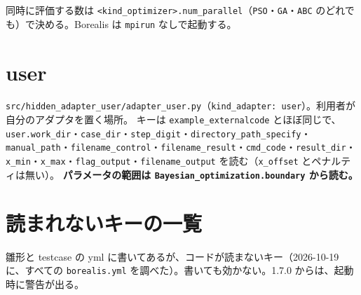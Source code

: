 同時に評価する数は \texttt{<kind\_\allowbreak{}optimizer>.\allowbreak{}num\_\allowbreak{}parallel}（\texttt{PSO}・\texttt{GA}・\texttt{ABC} のどれでも）で決める。Borealis は \texttt{mpirun} なしで起動する。

\section{user}

\texttt{src/\allowbreak{}hidden\_\allowbreak{}adapter\_\allowbreak{}user/\allowbreak{}adapter\_\allowbreak{}user.\allowbreak{}py}（\texttt{kind\_\allowbreak{}adapter: user}）。利用者が自分のアダプタを置く場所。
キーは \texttt{example\_\allowbreak{}externalcode} とほぼ同じで、\texttt{user.\allowbreak{}work\_\allowbreak{}dir}・\texttt{case\_\allowbreak{}dir}・\texttt{step\_\allowbreak{}digit}・\texttt{directory\_\allowbreak{}path\_\allowbreak{}specify}・\texttt{manual\_\allowbreak{}path}・\texttt{filename\_\allowbreak{}control}・\texttt{filename\_\allowbreak{}result}・\texttt{cmd\_\allowbreak{}code}・\texttt{result\_\allowbreak{}dir}・\texttt{x\_\allowbreak{}min}・\texttt{x\_\allowbreak{}max}・\texttt{flag\_\allowbreak{}output}・\texttt{filename\_\allowbreak{}output} を読む（\texttt{x\_\allowbreak{}offset} とペナルティは無い）。
\textbf{パラメータの範囲は \texttt{Bayesian\_\allowbreak{}optimization.\allowbreak{}boundary} から読む。}

\section{読まれないキーの一覧}

雛形と testcase の yml に書いてあるが、コードが読まないキー（2026-10-19 に、すべての \texttt{borealis.\allowbreak{}yml} を調べた）。書いても効かない。1.7.0 からは、起動時に警告が出る。

